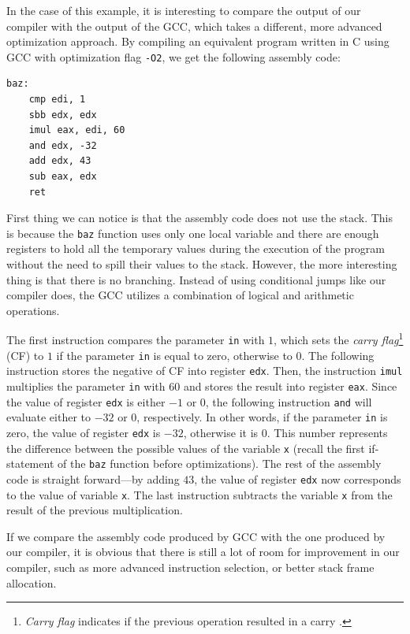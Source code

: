 \documentclass[thesis=M,english]{FITthesis}[2019/12/23]
\begin{document}
In the case of this example, it is interesting to compare the output of our compiler with the output of the GCC, which takes a different, more advanced optimization approach. By compiling an equivalent program written in C using GCC with optimization flag \texttt{-O2}, we get the following assembly code:

\begin{verbatim}
baz:
    cmp edi, 1
    sbb edx, edx
    imul eax, edi, 60
    and edx, -32
    add edx, 43
    sub eax, edx
    ret
\end{verbatim}

First thing we can notice is that the assembly code does not use the stack. This is because the \texttt{baz} function uses only one local variable and there are enough registers to hold all the temporary values during the execution of the program without the need to spill their values to the stack. However, the more interesting thing is that there is no branching. Instead of using conditional jumps like our compiler does, the GCC utilizes a combination of logical and arithmetic operations.

The first instruction compares the parameter \texttt{in} with $1$, which sets the \emph{carry flag}\footnote{\emph{Carry flag} indicates if the previous operation resulted in a carry \cite[Chap. 2.3.1.5]{x86_assembly}.} (CF) to $1$ if the parameter \texttt{in} is equal to zero, otherwise to $0$. The following instruction stores the negative of CF into register \texttt{edx}. Then, the instruction \texttt{imul} multiplies the parameter \texttt{in} with $60$ and stores the result into register \texttt{eax}. Since the value of register \texttt{edx} is either $-1$ or $0$, the following instruction \texttt{and} will evaluate either to $-32$ or $0$, respectively. In other words, if the parameter \texttt{in} is zero, the value of register \texttt{edx} is $-32$, otherwise it is $0$. This number represents the difference between the possible values of the variable \texttt{x} (recall the first if-statement of the \texttt{baz} function before optimizations). The rest of the assembly code is straight forward---by adding $43$, the value of  register \texttt{edx} now corresponds to the value of variable \texttt{x}. The last instruction subtracts the variable \texttt{x} from the result of the previous multiplication.

If we compare the assembly code produced by GCC with the one produced by our compiler, it is obvious that there is still a lot of room for improvement in our compiler, such as more advanced instruction selection, or better stack frame allocation.
\end{document}
